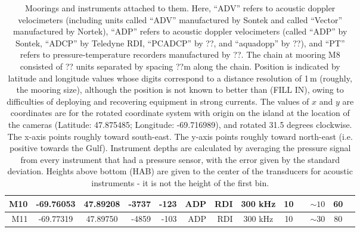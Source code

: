 \documentclass[letterpaper,10pt,landscape]{article}
\begin{document}
\begin{table}
\begin{tabular}{|r|c|c|r|r|r|r|c|c|c|c|c|c|}
    M10                 & -69.76053                  & 47.89208                  & -3737                  & -123                  & ADP          & RDI      & 300 kHz  & 10        &          & $\sim10$   & 60                  \\\hline
    M11                 & -69.77319                  & 47.89750                  & -4859                  & -103                  & ADP          & RDI      & 300 kHz  & 10        &          & $\sim30$   & 80                  \\\hline
  \end{tabular}
  
  \caption{Moorings and instruments attached to them.  Here, ``ADV''
    refers to acoustic doppler velocimeters (including units called
    ``ADV'' manufactured by Sontek and called ``Vector'' manufactured
    by Nortek), ``ADP'' refers to acoustic doppler velocimeters
    (called ``ADP'' by Sontek, ``ADCP'' by Teledyne RDI, ``PCADCP'' by
    ??, and ``aquadopp'' by ??), and ``PT'' refers to
    pressure-temperature recorders manufactured by ??.  The chain at
    mooring M8 consisted of ?? units separated by spacing ??m along
    the chain.  Position is indicated by latitude and longitude values
    whose digits correspond to a distance resolution of 1\,m (roughly,
    the mooring size), although the position is not known to better
    than (FILL IN), owing to difficulties of deploying and recovering
    equipment in strong currents.  The values of $x$ and $y$ are
    coordinates are for the rotated coordinate system with origin on
    the island at the location of the cameras (Latitude: 47.875485;
    Longitude: -69.716989), and rotated 31.5 degrees clockwise. The
    x-axis points roughly toward south-east. The y-axis points roughly
    toward north-east (i.e. positive towards the Gulf). Instrument
    depths are calculated by averaging the pressure signal from every
    instrument that had a pressure sensor, with the error given by the
    standard deviation. Heights above bottom (HAB) are given to the
    center of the transducers for acoustic instruments - it is not the
    height of the first bin.}
  \end{table}
\end{document}
